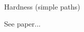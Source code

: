 \begin{frame}{Hardness \small (simple paths)}

\onslide<+>
\onslide<+>
\begin{center}
 
\end{center}

\onslide<+>
\vfill \hfill \small See paper...
\end{frame}